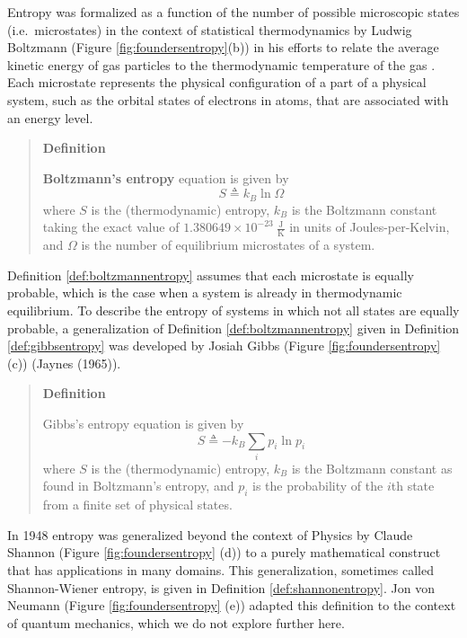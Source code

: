 \documentclass[
  letterpaper,
  DIV=11,
  numbers=noendperiod]{scrreprt}
\begin{document}
Entropy was formalized as a function of the number of possible
microscopic states (i.e.~microstates) in the context of statistical
thermodynamics by Ludwig Boltzmann (Figure \ref{fig:foundersentropy}(b))
in his efforts to relate the average kinetic energy of gas particles to
the thermodynamic temperature of the gas \cite{Uffink2022}. Each
microstate represents the physical configuration of a part of a physical
system, such as the orbital states of electrons in atoms, that are
associated with an energy level.

\begin{quote}
\textbf{Definition}

\textbf{Boltzmann's entropy} equation is given by \begin{equation*}
S \triangleq k_B \ln \Omega
\end{equation*} where \(S\) is the (thermodynamic) entropy, \(k_B\) is
the Boltzmann constant taking the exact value of
\(1.380649 \times 10^{-23}\ \frac{\text{J}}{\text{K}}\) in units of
Joules-per-Kelvin, and \(\Omega\) is the number of equilibrium
microstates of a system.
\end{quote}

Definition \ref{def:boltzmannentropy} assumes that each microstate is
equally probable, which is the case when a system is already in
thermodynamic equilibrium. To describe the entropy of systems in which
not all states are equally probable, a generalization of Definition
\ref{def:boltzmannentropy} given in Definition \ref{def:gibbsentropy}
was developed by Josiah Gibbs (Figure \ref{fig:foundersentropy}(c))
(Jaynes (1965)).

\begin{quote}
\textbf{Definition}

Gibbs's entropy equation is given by \begin{equation*}
S \triangleq -  k_B \sum_i p_i \ln p_i
\end{equation*} where \(S\) is the (thermodynamic) entropy, \(k_B\) is
the Boltzmann constant as found in Boltzmann's entropy, and \(p_i\) is
the probability of the \(i\)th state from a finite set of physical
states.
\end{quote}

In 1948 entropy was generalized beyond the context of Physics by Claude
Shannon (Figure \ref{fig:foundersentropy} (d)) to a purely mathematical
construct that has applications in many domains. This generalization,
sometimes called Shannon-Wiener entropy, is given in Definition
\ref{def:shannonentropy}. Jon von Neumann (Figure
\ref{fig:foundersentropy} (e)) adapted this definition to the context of
quantum mechanics, which we do not explore further here.
\end{document}
